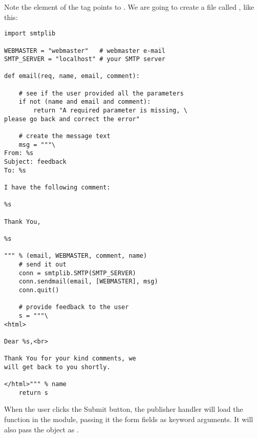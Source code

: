 Note the  element of the  tag points to
. We are going to create a file called ,
like this:

\begin{verbatim}
import smtplib

WEBMASTER = "webmaster"   # webmaster e-mail
SMTP_SERVER = "localhost" # your SMTP server

def email(req, name, email, comment):

    # see if the user provided all the parameters
    if not (name and email and comment):
        return "A required parameter is missing, \
please go back and correct the error"

    # create the message text
    msg = """\
From: %s                                                                                                                                           
Subject: feedback
To: %s

I have the following comment:

%s

Thank You,

%s                                                                                                                                                 

""" % (email, WEBMASTER, comment, name)                                                                                                                       
    # send it out
    conn = smtplib.SMTP(SMTP_SERVER)
    conn.sendmail(email, [WEBMASTER], msg)
    conn.quit()

    # provide feedback to the user
    s = """\
<html>

Dear %s,<br>                                                                                                                                       

Thank You for your kind comments, we
will get back to you shortly.

</html>""" % name                                                                                                                                  
    return s
\end{verbatim}

When the user clicks the Submit button, the publisher handler will
load the  function in the  module,
passing it the form fields as keyword arguments. It will also pass the
\class{Request} object as \code{req}.  

